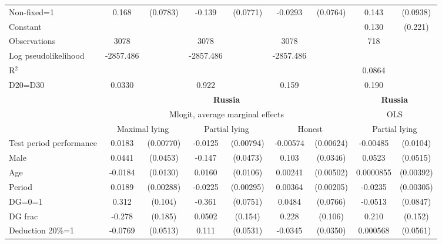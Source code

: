 \begin{tabular}{l|cccccc|cc}
Non-fixed=1     &    0.168\sym{**} & (0.0783)&   -0.139\sym{*}  & (0.0771)&  -0.0293         & (0.0764)&    0.143         & (0.0938)\\
Constant        &                  &         &                  &         &                  &         &    0.130         &  (0.221)\\
\hline
Observations    &     3078         &         &     3078         &         &     3078         &         &      718         &         \\
Log pseudolikelihood  & -2857.486   &         &    -2857.486                &         &     -2857.486               &         &           &   \\ 
R$^2$      &                  &         &                  &         &                  &         &        0.0864   &   \\ 
D20=D30         &   0.0330         &         &    0.922         &         &    0.159         &         &    0.190         &         \\
\hline\hline
&\multicolumn{6}{c|}{\bf Russia}&\multicolumn{2}{c}{\bf Russia}\\ &\multicolumn{6}{c|}{Mlogit, average marginal effects }&\multicolumn{2}{c}{OLS}\\
                &\multicolumn{2}{c}{Maximal lying}&\multicolumn{2}{c}{Partial lying}&\multicolumn{2}{c}{Honest}  &\multicolumn{2}{c}{Partial lying}\\
\hline
Test period performance&   0.0183\sym{**} &(0.00770)&  -0.0125         &(0.00794)& -0.00574         &(0.00624)& -0.00485         & (0.0104)\\
Male            &   0.0441         & (0.0453)&   -0.147\sym{***}& (0.0473)&    0.103\sym{***}& (0.0346)&   0.0523         & (0.0515)\\
Age             &  -0.0184         & (0.0130)&   0.0160         & (0.0106)&  0.00241         &(0.00502)&0.0000855         &(0.00392)\\
Period          &   0.0189\sym{***}&(0.00288)&  -0.0225\sym{***}&(0.00295)&  0.00364\sym{*}  &(0.00205)&  -0.0235\sym{***}&(0.00305)\\
DG=0=1          &    0.312\sym{***}&  (0.104)&   -0.361\sym{***}& (0.0751)&   0.0484         & (0.0766)&  -0.0513         & (0.0847)\\
DG frac         &   -0.278         &  (0.185)&   0.0502         &  (0.154)&    0.228\sym{**} &  (0.106)&    0.210         &  (0.152)\\
Deduction 20\%=1&  -0.0769         & (0.0513)&    0.111\sym{**} & (0.0531)&  -0.0345         & (0.0350)& 0.000568         & (0.0561)\\

\end{tabular}
